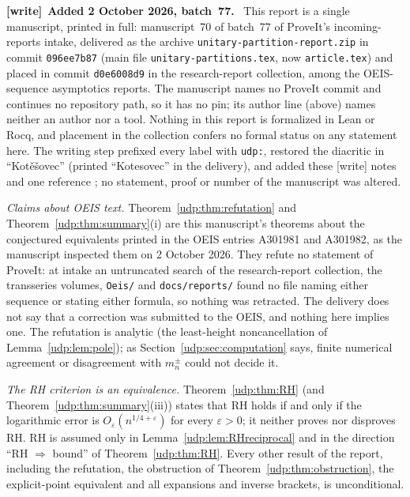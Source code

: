 \documentclass[11pt]{article}
\theoremstyle{remark}\newtheorem{remark}[theorem]{Remark}
\newcommand{\eps}{\varepsilon}
\newenvironment{writenote}[1][]{\par\smallskip\begingroup\small
 \noindent\textbf{[write]}\if\relax\detokenize{#1}\relax\else~\textbf{#1.}\fi\ }%
 {\par\endgroup\smallskip}
\numberwithin{equation}{section}
\begin{document}
\begin{writenote}[Added 2 October 2026, batch~77]
This report is a single manuscript, printed in full: manuscript~70 of
batch~77 of ProveIt's incoming-reports intake, delivered as the archive
\texttt{unitary-\allowbreak partition-\allowbreak report.zip} in commit
\texttt{096ee7b87} (main file \texttt{unitary-\allowbreak partitions.tex}, now
\texttt{article.tex}) and placed in commit \texttt{d0e6008d9} in the
research-report collection, among the OEIS-sequence asymptotics reports.
The manuscript names no ProveIt commit and continues no repository path, so it
has no pin; its author line (above) names neither an author nor a tool.
Nothing in this report is formalized in Lean or Rocq, and placement in the
collection confers no formal status on any statement here. The writing step
prefixed every label with \texttt{udp:}, restored the diacritic in
``Kot\v{e}\v{s}ovec'' (printed ``Kotesovec'' in the delivery), and added
these \textsf{[write]} notes and one reference \cite{udp-tai}; no statement,
proof or number of the manuscript was altered.

\emph{Claims about OEIS text.} Theorem~\ref{udp:thm:refutation} and
Theorem~\ref{udp:thm:summary}(i) are this manuscript's theorems about the
conjectured equivalents printed in the OEIS entries A301981 and A301982, as
the manuscript inspected them on 2 October 2026. They refute no statement of
ProveIt: at intake an untruncated search of the research-report collection,
the transseries volumes, \texttt{Oeis/} and \texttt{docs/reports/} found no
file naming either sequence or stating either formula, so nothing was
retracted. The delivery does not say that a correction was submitted to the
OEIS, and nothing here implies one. The refutation is analytic (the
least-height noncancellation of Lemma~\ref{udp:lem:pole}); as
Section~\ref{udp:sec:computation} says, finite numerical agreement or
disagreement with $m_n^\pm$ could not decide it.

\emph{The RH criterion is an equivalence.} Theorem~\ref{udp:thm:RH} (and
Theorem~\ref{udp:thm:summary}(iii)) states that RH holds if and only if the
logarithmic error is $O_\eps(n^{1/4+\eps})$ for every $\eps>0$; it neither
proves nor disproves RH. RH is assumed only in Lemma~\ref{udp:lem:RHreciprocal}
and in the direction ``RH $\Rightarrow$ bound'' of Theorem~\ref{udp:thm:RH}.
Every other result of the report, including the refutation, the obstruction
of Theorem~\ref{udp:thm:obstruction}, the explicit-point equivalent and all
expansions and inverse brackets, is unconditional.


\end{writenote}
\end{document}
